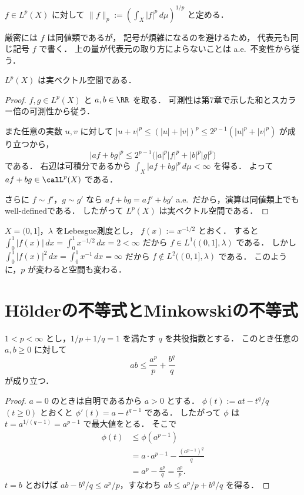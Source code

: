 \begin{definition}
$f\in L^p(X)$ に対して
$\|f\|_p:=\left(\int_X |f|^p\,d\mu\right)^{1/p}$ と定める．
\end{definition}

\begin{remark}
厳密には $f$ は同値類であるが，
記号が煩雑になるのを避けるため，
代表元も同じ記号 $f$ で書く．
上の量が代表元の取り方によらないことは a.e.\ 不変性から従う．
\end{remark}

\begin{proposition}
$L^p(X)$ は実ベクトル空間である．
\end{proposition}
\begin{proof}
$f,g\in L^p(X)$ と $a,b\in\RR$ を取る．
可測性は第7章で示した和とスカラー倍の可測性から従う．

また任意の実数 $u,v$ に対して
$|u+v|^p\le (|u|+|v|)^p\le 2^{p-1}(|u|^p+|v|^p)$ が成り立つから，
\[
|af+bg|^p
\le
2^{p-1}\bigl(|a|^p|f|^p+|b|^p|g|^p\bigr)
\]
である．
右辺は可積分であるから
$\int_X |af+bg|^p\,d\mu<\infty$ を得る．
よって $af+bg\in \calL^p(X)$ である．

さらに $f\sim f'$，$g\sim g'$ なら
$af+bg=af'+bg'$ a.e.\ だから，演算は同値類上でもwell-definedである．
したがって $L^p(X)$ は実ベクトル空間である．
\end{proof}

\begin{example}
$X=(0,1]$，$\lambda$ をLebesgue測度とし，
$f(x):=x^{-1/2}$ とおく．
すると
$\int_0^1 |f(x)|\,dx=\int_0^1 x^{-1/2}\,dx=2<\infty$ だから
$f\in L^1((0,1],\lambda)$ である．
しかし
$\int_0^1 |f(x)|^2\,dx=\int_0^1 x^{-1}\,dx=\infty$ だから
$f\notin L^2((0,1],\lambda)$ である．
このように，$p$ が変わると空間も変わる．
\end{example}

\section{Hölderの不等式とMinkowskiの不等式}

\begin{lemma}[Youngの不等式]
$1<p<\infty$ とし，$1/p+1/q=1$ を満たす $q$ を共役指数とする．
このとき任意の $a,b\ge 0$ に対して
\[
ab\le \frac{a^p}{p}+\frac{b^q}{q}
\]
が成り立つ．
\end{lemma}
\begin{proof}
$a=0$ のときは自明であるから $a>0$ とする．
$\phi(t):=at-t^q/q$ $(t\ge 0)$ とおくと $\phi'(t)=a-t^{q-1}$ である．
したがって $\phi$ は $t=a^{1/(q-1)}=a^{p-1}$ で最大値をとる．
そこで
\begin{align*}
\phi(t)
&\le \phi(a^{p-1}) \\
&= a\cdot a^{p-1}-\frac{(a^{p-1})^q}{q} \\
&= a^p-\frac{a^p}{q}
=\frac{a^p}{p}.
\end{align*}
$t=b$ とおけば
$ab-b^q/q\le a^p/p$，すなわち $ab\le a^p/p+b^q/q$ を得る．
\end{proof}

